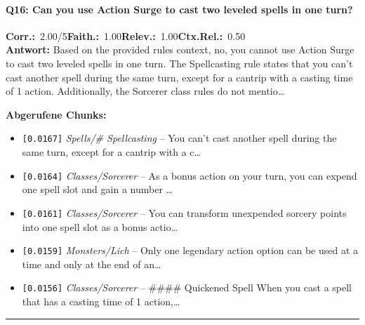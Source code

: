 \paragraph{Q16: Can you use Action Surge to cast two leveled spells in one turn?}
\noindent \textbf{Corr.:}~2.00/5\quad \textbf{Faith.:}~1.00\quad \textbf{Relev.:}~1.00\quad \textbf{Ctx.Rel.:}~0.50\\

\noindent\textbf{Antwort:} Based on the provided rules context, no, you cannot use Action Surge to cast two leveled spells in one turn. The Spellcasting rule states that you can't cast another spell during the same turn, except for a cantrip with a casting time of 1 action. Additionally, the Sorcerer class rules do not mentio\ldots

\noindent\textbf{Abgerufene Chunks:}
\begin{itemize}[noitemsep, topsep=2pt]
  \item[\textbf{\#1}] \texttt{[0.0167]} \textit{Spells/# Spellcasting} -- You can't cast another spell during the same turn, except for a cantrip with a c\ldots
  \item[\textbf{\#2}] \texttt{[0.0164]} \textit{Classes/Sorcerer} -- As a bonus action on your turn, you can expend one spell slot and gain a number \ldots
  \item[\textbf{\#3}] \texttt{[0.0161]} \textit{Classes/Sorcerer} -- You can transform unexpended sorcery points into one spell slot as a bonus actio\ldots
  \item[\textbf{\#4}] \texttt{[0.0159]} \textit{Monsters/Lich} -- Only one legendary action option can be used at a time and only at the end of an\ldots
  \item[\textbf{\#5}] \texttt{[0.0156]} \textit{Classes/Sorcerer} -- \#\#\#\# Quickened Spell  When you cast a spell that has a casting time of 1 action,\ldots
\end{itemize}
\vspace{4pt}
\hrule
\vspace{6pt}
